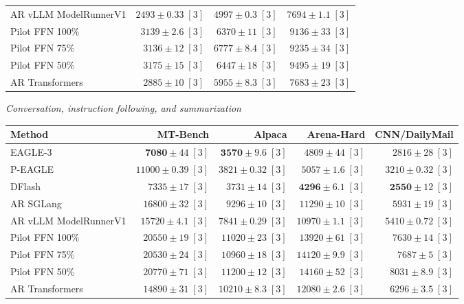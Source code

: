 \begin{table}[!htp]
\begin{tabular}{@{}>{\raggedright\arraybackslash}p{3.7cm}rrr@{}}
AR \textperiodcentered{} vLLM ModelRunnerV1 & \(2493 \pm 0.33\;[3]\) & \(4997 \pm 0.3\;[3]\) & \(7694 \pm 1.1\;[3]\) \\
Pilot FFN 100\% & \(3139 \pm 2.6\;[3]\) & \(6370 \pm 11\;[3]\) & \(9136 \pm 33\;[3]\) \\
Pilot FFN 75\% & \(3136 \pm 12\;[3]\) & \(6777 \pm 8.4\;[3]\) & \(9235 \pm 34\;[3]\) \\
Pilot FFN 50\% & \(3175 \pm 15\;[3]\) & \(6447 \pm 18\;[3]\) & \(9495 \pm 19\;[3]\) \\
AR \textperiodcentered{} Transformers & \(2885 \pm 10\;[3]\) & \(5955 \pm 8.3\;[3]\) & \(7683 \pm 23\;[3]\) \\
\bottomrule
\end{tabular}\par\medskip
\textit{Conversation, instruction following, and summarization}\par\smallskip
\begin{tabular}{@{}>{\raggedright\arraybackslash}p{3.7cm}rrrr@{}}
\toprule
Method & MT-Bench & Alpaca & Arena-Hard & CNN/DailyMail \\
\midrule
EAGLE-3 & \(\mathbf{7080} \pm 44\;[3]\) & \(\mathbf{3570} \pm 9.6\;[3]\) & \(4809 \pm 44\;[3]\) & \(2816 \pm 28\;[3]\) \\
P-EAGLE & \(11000 \pm 0.39\;[3]\) & \(3821 \pm 0.32\;[3]\) & \(5057 \pm 1.6\;[3]\) & \(3210 \pm 0.32\;[3]\) \\
DFlash & \(7335 \pm 17\;[3]\) & \(3731 \pm 14\;[3]\) & \(\mathbf{4296} \pm 6.1\;[3]\) & \(\mathbf{2550} \pm 12\;[3]\) \\
AR \textperiodcentered{} SGLang & \(16800 \pm 32\;[3]\) & \(9296 \pm 10\;[3]\) & \(11290 \pm 10\;[3]\) & \(5931 \pm 19\;[3]\) \\
AR \textperiodcentered{} vLLM ModelRunnerV1 & \(15720 \pm 4.1\;[3]\) & \(7841 \pm 0.29\;[3]\) & \(10970 \pm 1.1\;[3]\) & \(5410 \pm 0.72\;[3]\) \\
Pilot FFN 100\% & \(20550 \pm 19\;[3]\) & \(11020 \pm 23\;[3]\) & \(13920 \pm 61\;[3]\) & \(7630 \pm 14\;[3]\) \\
Pilot FFN 75\% & \(20530 \pm 24\;[3]\) & \(10960 \pm 18\;[3]\) & \(14120 \pm 9.9\;[3]\) & \(7687 \pm 5\;[3]\) \\
Pilot FFN 50\% & \(20770 \pm 71\;[3]\) & \(11200 \pm 12\;[3]\) & \(14160 \pm 52\;[3]\) & \(8031 \pm 8.9\;[3]\) \\
AR \textperiodcentered{} Transformers & \(14890 \pm 31\;[3]\) & \(10210 \pm 8.3\;[3]\) & \(12080 \pm 2.6\;[3]\) & \(6296 \pm 3.5\;[3]\) \\

\end{tabular}
\end{table}
